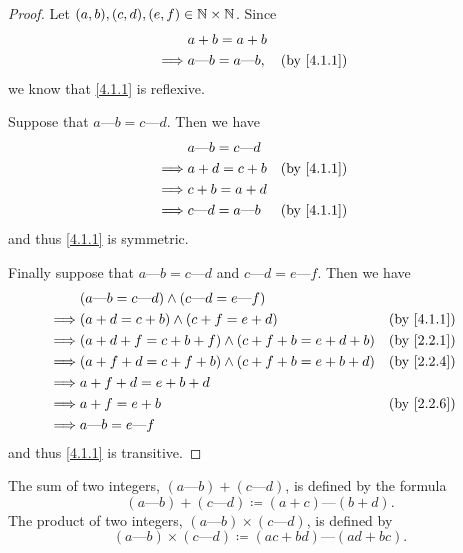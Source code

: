 \begin{proof}
  Let \((a, b), (c, d), (e, f) \in \mathbb{N} \times \mathbb{N}\).
  Since
  \begin{align*}
             & a + b = a + b                                    \\
    \implies & a \text{---} b = a \text{---} b, &  & \by{4.1.1}
  \end{align*}
  we know that \cref{4.1.1} is reflexive.

  Suppose that \(a \text{---} b = c \text{---} d\).
  Then we have
  \begin{align*}
             & a \text{---} b = c \text{---} d                 \\
    \implies & a + d = c + b                   &  & \by{4.1.1} \\
    \implies & c + b = a + d                                   \\
    \implies & c \text{---} d = a \text{---} b &  & \by{4.1.1}
  \end{align*}
  and thus \cref{4.1.1} is symmetric.

  Finally suppose that \(a \text{---} b = c \text{---} d\) and \(c \text{---} d = e \text{---} f\).
  Then we have
  \begin{align*}
             & (a \text{---} b = c \text{---} d) \land (c \text{---} d = e \text{---} f)                 \\
    \implies & (a + d = c + b) \land (c + f = e + d)                                     &  & \by{4.1.1} \\
    \implies & (a + d + f = c + b + f) \land (c + f + b = e + d + b)                     &  & \by{2.2.1} \\
    \implies & (a + f + d = c + f + b) \land (c + f + b = e + b + d)                     &  & \by{2.2.4} \\
    \implies & a + f + d = e + b + d                                                                     \\
    \implies & a + f = e + b                                                             &  & \by{2.2.6} \\
    \implies & a \text{---} b = e \text{---} f
  \end{align*}
  and thus \cref{4.1.1} is transitive.
\end{proof}

\begin{defn}\label{4.1.2}
  The sum of two integers, \((a \text{---} b) + (c \text{---} d)\), is defined by the formula
  \[
    (a \text{---} b) + (c \text{---} d) \coloneqq (a + c) \text{---} (b + d).
  \]
  The product of two integers, \((a \text{---} b) \times (c \text{---} d)\), is defined by
  \[
    (a \text{---} b) \times (c \text{---} d) \coloneqq (ac + bd) \text{---} (ad + bc).
  \]
\end{defn}

